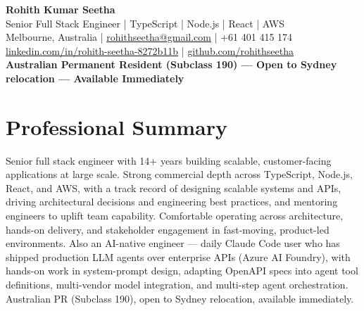 \documentclass[11pt,a4paper]{article}
\begin{document}
\begin{center}
  {\Huge \textbf{Rohith Kumar Seetha}}\\[0.3em]
  {\large Senior Full Stack Engineer \;|\; TypeScript \;|\; Node.js \;|\; React \;|\; AWS}\\[0.3em]
  Melbourne, Australia \;|\; \href{mailto:rohithseetha@gmail.com}{rohithseetha@gmail.com} \;|\; +61 401 415 174\\
  \href{https://linkedin.com/in/rohith-seetha-8272b11b}{linkedin.com/in/rohith-seetha-8272b11b} \;|\;
  \href{https://github.com/rohithseetha}{github.com/rohithseetha}\\[0.3em]
  \textbf{\color{accent}Australian Permanent Resident (Subclass 190) --- Open to Sydney relocation --- Available Immediately}
\end{center}

\section*{Professional Summary}
Senior full stack engineer with 14+ years building scalable, customer-facing applications at large scale. Strong
commercial depth across TypeScript, Node.js, React, and AWS, with a track record of designing scalable systems and
APIs, driving architectural decisions and engineering best practices, and mentoring engineers to uplift team
capability. Comfortable operating across architecture, hands-on delivery, and stakeholder engagement in
fast-moving, product-led environments. Also an AI-native engineer --- daily Claude Code user who has shipped
production LLM agents over enterprise APIs (Azure AI Foundry), with hands-on work in system-prompt design,
adapting OpenAPI specs into agent tool definitions, multi-vendor model integration, and multi-step agent
orchestration. Australian PR (Subclass 190), open to Sydney relocation, available immediately.
\end{document}
